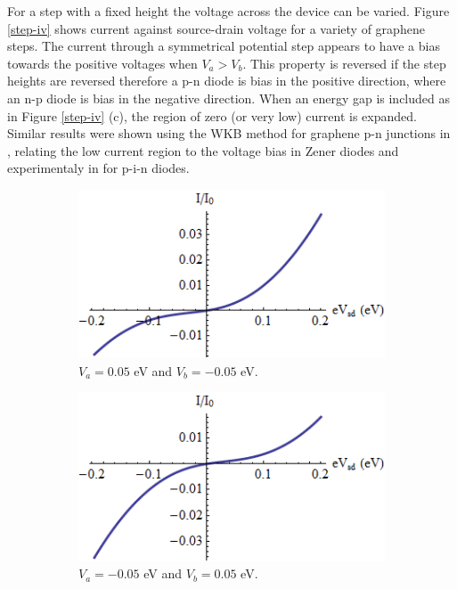 			For a step with a fixed height the voltage across the device can be varied. Figure \ref{step-iv} shows current against source-drain voltage for a variety of graphene steps. The current through a symmetrical potential step appears to have a bias towards the positive voltages when $V_{a}>V_{b}$. This property is reversed if the step heights are reversed therefore a p-n diode is bias in the positive direction, where an n-p diode is bias in the negative direction. When an energy gap is included as in Figure \ref{step-iv} (c), the region of zero (or very low) current is expanded. Similar results were shown using the WKB method for graphene p-n junctions in \cite{b48}, relating the low current region to the voltage bias in Zener diodes and experimentaly in \cite{b57} for p-i-n diodes. 
		\begin{figure}[h]
			 \begin{subfigure}[h]{0.3\textwidth}
				\centerline{\includegraphics[scale=0.35]{images/step-v-1}}
				\caption{$V_{a}=0.05$ eV and $V_{b}=-0.05$ eV.}
			\end{subfigure}
			\hspace{0.5cm}
			\begin{subfigure}[h]{0.3\textwidth}
				\centerline{\includegraphics[scale=0.35]{images/step-v-2}}
				\caption{$V_{a}=-0.05$ eV and $V_{b}=0.05$ eV.}
			\end{subfigure}
			\hspace{0.5cm}
			\begin{subfigure}[h]{0.3\textwidth}

\end{subfigure}
\end{figure}
